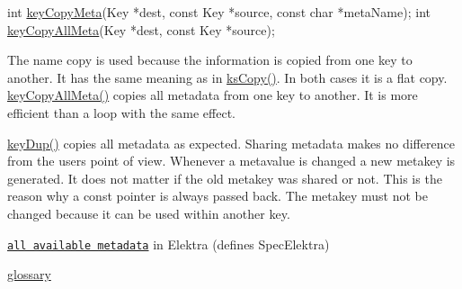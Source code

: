 \begin{DoxyCode}
\textcolor{keywordtype}{int} \hyperlink{group__keymeta_ga9a22b992478e613c8788bd460b4a1f0c}{keyCopyMeta}(Key *dest, \textcolor{keyword}{const} Key *source, \textcolor{keyword}{const} \textcolor{keywordtype}{char} *metaName);
\textcolor{keywordtype}{int} \hyperlink{group__keymeta_ga8e63720a65610a29597494d0671f9401}{keyCopyAllMeta}(Key *dest, \textcolor{keyword}{const} Key *source);
\end{DoxyCode}


The name {\ttfamily copy} is used because the information is copied from one key to another. It has the same meaning as in {\ttfamily \hyperlink{group__keyset_gaba1f1dbea191f4d7e7eb3e4296ae7d5e}{ks\+Copy()}}. In both cases it is a flat copy. {\ttfamily \hyperlink{group__keymeta_ga8e63720a65610a29597494d0671f9401}{key\+Copy\+All\+Meta()}} copies all metadata from one key to another. It is more efficient than a loop with the same effect.

{\ttfamily \hyperlink{group__key_gae6ec6a60cc4b8c1463fa08623d056ce3}{key\+Dup()}} copies all metadata as expected. Sharing metadata makes no difference from the user\textquotesingle{}s point of view. Whenever a metavalue is changed a new metakey is generated. It does not matter if the old metakey was shared or not. This is the reason why a const pointer is always passed back. The metakey must not be changed because it can be used within another key.


\begin{DoxyItemize}
\item \href{/home/jenkins/workspace/libelektra-release/doc/METADATA.ini}{\tt all available metadata} in Elektra (defines Spec\+Elektra)
\item \hyperlink{doc_help_elektra-glossary_md}{glossary} 
\end{DoxyItemize}